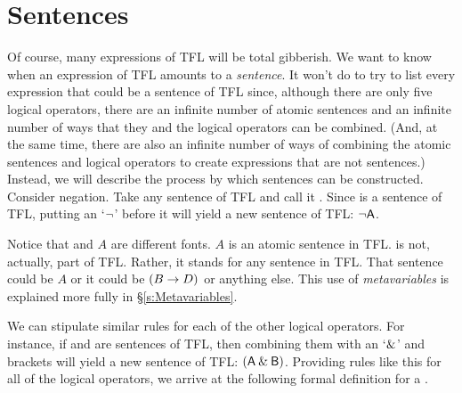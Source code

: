 \section{Sentences}\label{s:Sentences}
Of course, many expressions of TFL will be total gibberish. We want to know when an expression of TFL amounts to a \emph{sentence}. It won't do to try to list every expression that could be a sentence of TFL since, although there are only five logical operators, there are an infinite number of atomic sentences and an infinite number of ways that they and the logical operators can be combined. (And, at the same time, there are also an infinite number of ways of combining the atomic sentences and logical operators to create expressions that are not sentences.)
Instead, we will describe the process by which sentences can be constructed. Consider negation. Take any sentence of TFL and call it . Since  is a sentence of TFL, putting an `${\neg}$' before it will yield a new sentence of TFL: ${\neg}\mathsf{A}$.

\begin{notebox}
Notice that  and $A$ are different fonts. $A$ is an atomic sentence in TFL.  is not, actually, part of TFL. Rather, it stands for any sentence in TFL. That sentence could be $A$ or it could be $(B \rightarrow D)$ or anything else. This use of \textit{metavariables} is explained more fully in \S\ref{s:Metavariables}.
\end{notebox}

We can stipulate similar rules for each of the other logical operators. For instance, if  and  are sentences of TFL, then combining them with an `$\mathbin{\&}$' and brackets will yield a new sentence of TFL: $(\mathsf{A}\mathbin{\&}\mathsf{B})$. Providing rules like this for all of the logical operators, we arrive at the following formal definition for a .

